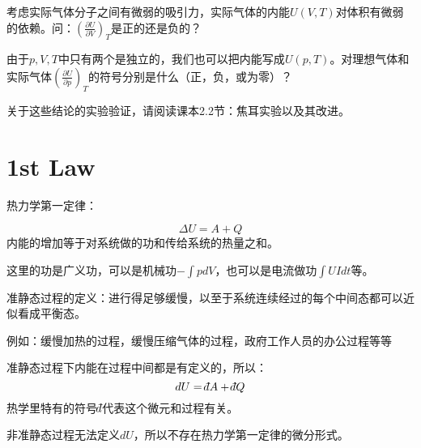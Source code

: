 \documentclass[CJK]{beamer}
\begin{document}
\begin{frame}
\bch
{}

考虑实际气体分子之间有微弱的吸引力，实际气体的内能$U(V,T)$对体积有微弱的依赖。问：$\left(\frac{\partial U}{\partial V}\right)_T$是正的还是负的？
\ech
\end{frame}


\begin{frame}
\bch
{}

由于$p, V, T$中只有两个是独立的，我们也可以把内能写成$U(p, T)$。对理想气体和实际气体$\left(\frac{\partial U}{\partial p}\right)_T$的符号分别是什么（正，负，或为零）？

\skiplines

关于这些结论的实验验证，请阅读课本2.2节：焦耳实验以及其改进。
\ech
\end{frame}


\section{1st Law}

\begin{frame}
\bch
热力学第一定律：

{\blue
$$ \Delta U = A + Q$$
内能的增加等于对系统做的功和传给系统的热量之和。
}

\skiplines

这里的功是{\blue 广义功}，可以是机械功$-\int pdV$，也可以是电流做功$\int UIdt$等。
\ech
\end{frame}


\begin{frame}
\bch
准静态过程的定义：{\blue 进行得足够缓慢，以至于系统连续经过的每个中间态都可以近似看成平衡态。}

\skiplines

{\small 例如：缓慢加热的过程，缓慢压缩气体的过程，政府工作人员的办公过程等等}


\ech
\end{frame}


\begin{frame}
\bch
准静态过程下内能在过程中间都是有定义的，所以：
{\blue
$$dU = \dbar A + \dbar Q$$
}
热学里特有的符号$\dbar$代表这个微元和过程有关。

\skiplines

非准静态过程无法定义$dU$，所以不存在热力学第一定律的微分形式。
\ech
\end{frame}
\end{document}
